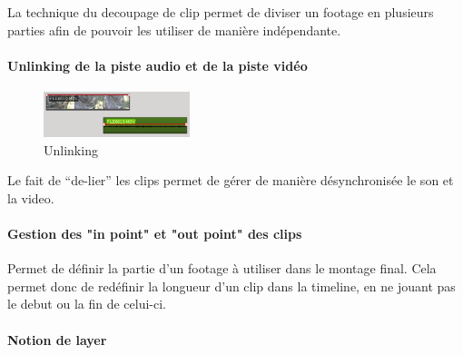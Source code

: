 La technique du decoupage de clip permet de diviser un footage en
plusieurs parties afin de pouvoir les utiliser de manière indépendante.

\paragraph{}

\paragraph{Unlinking de la piste audio et de la piste vidéo}

\begin{figure}

  \vspace{-20pt} \begin{center}

  \includegraphics[width=0.38\textwidth]{images/unlinked}

  \end{center} \vspace{-30pt} \caption{Unlinking} \label{Yes}

  \vspace{-10pt}

\end{figure}

Le fait de ``de-lier'' les clips permet de gérer de manière
désynchronisée le son et la video.

\paragraph{Gestion des "in point" et  "out point" des clips}

  Permet de définir la partie d'un footage à utiliser dans le montage
  final. Cela permet donc de redéfinir la longueur d'un clip dans la
  timeline, en ne jouant pas le debut ou la fin de celui-ci.

\paragraph{}

\paragraph{Notion de layer}


